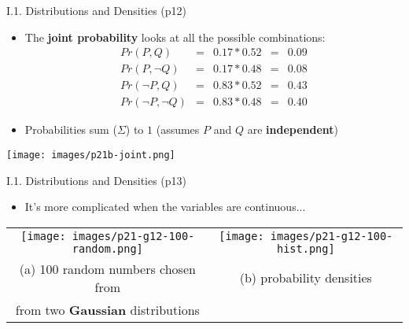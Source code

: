 \documentclass[handout]{beamer}
\newcommand{\strong}[1]{\textbf{\color{teal} #1}}
\begin{document}
\begin{frame}{I.1. Distributions and Densities (p12)}
\begin{itemize}
\item The \strong{joint probability} looks at all the possible combinations:
\[
\begin{array}{rclcl}
Pr(P,Q)           & = & 0.17 * 0.52 & = & 0.09 \\
Pr(P,\neg Q)      & = & 0.17 * 0.48 & = & 0.08 \\
Pr(\neg P,Q)      & = & 0.83 * 0.52 & = & 0.43 \\
Pr(\neg P,\neg Q) & = & 0.83 * 0.48 & = & 0.40
\end{array}
\]
\item Probabilities sum ($\Sigma$) to $1$ {\footnotesize (assumes $P$ and $Q$ are \strong{independent})}
\end{itemize}
\begin{center}
\texttt{[image: images/p21b-joint.png]}
\end{center}
\end{frame}
\begin{frame}{I.1. Distributions and Densities (p13)}
\begin{itemize}
\item It's more complicated when the variables are continuous...
\end{itemize}
\begin{center}
\begin{tabular}{cc}
\texttt{[image: images/p21-g12-100-random.png]} &
\texttt{[image: images/p21-g12-100-hist.png]} \\
(a) 100 random numbers chosen from &
(b) probability densities \\
from two \strong{Gaussian} distributions \\
\end{tabular}
\end{center}
\end{frame}
\end{document}

